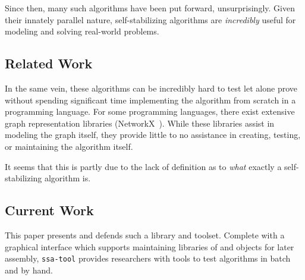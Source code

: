 Since then, many such algorithms have been put forward, unsurprisingly.
Given their innately parallel nature,
  self-stabilizing algorithms are \emph{incredibly} useful
  for modeling and solving real-world problems.

\subsection{Related Work}
\label{sec:introduction:related-work}
In the same vein, these algorithms can be incredibly hard to test
  \Dash let alone prove \Dash
  without spending significant time implementing the algorithm
  from scratch in a programming language.
For some programming languages,
  there exist extensive graph representation libraries (\eg NetworkX~\autocite{hagberg:networkx}).
While these libraries assist in modeling the graph itself,
  they provide little to no assistance in creating, testing, or maintaining the algorithm itself.

It seems that this is partly due to the lack of definition as to \emph{what} exactly a self-stabilizing algorithm is.

\subsection{Current Work}
\label{sec:introduction:current-work}
This paper presents and defends such a library and toolset.
Complete with a graphical interface which supports
  maintaining libraries of  and  objects for later assembly,
  \texttt{ssa-tool} provides researchers with tools to test algorithms in batch and by hand.

